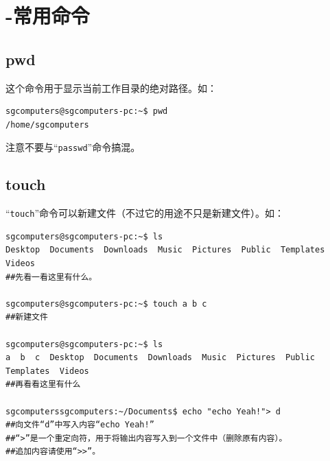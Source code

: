 \section{-常用命令}
\subsection{pwd}
这个命令用于显示当前工作目录的绝对路径。如：
\begin{verbatim}
sgcomputers@sgcomputers-pc:~$ pwd
/home/sgcomputers
\end{verbatim} \par
注意不要与“\verb|passwd|”命令搞混。
\subsection{touch}
\label{sec:nf}“\verb|touch|”命令可以新建文件（不过它的用途不只是新建文件）。如：
\begin{verbatim}
sgcomputers@sgcomputers-pc:~$ ls
Desktop  Documents  Downloads  Music  Pictures  Public  Templates  Videos
##先看一看这里有什么。

sgcomputers@sgcomputers-pc:~$ touch a b c
##新建文件

sgcomputers@sgcomputers-pc:~$ ls
a  b  c  Desktop  Documents  Downloads  Music  Pictures  Public  Templates  Videos
##再看看这里有什么

sgcomputerssgcomputers:~/Documents$ echo "echo Yeah!"> d
##向文件“d”中写入内容“echo Yeah!”
##“>”是一个重定向符，用于将输出内容写入到一个文件中（删除原有内容）。
##追加内容请使用“>>”。
\end{verbatim}
